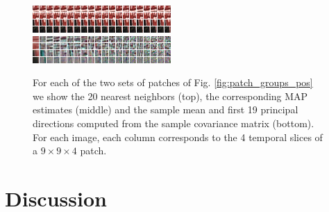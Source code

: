 \documentclass[10pt, journal, twocolumn, final, a4paper]{IEEEtran}
\begin{document}
\begin{figure}[htpb!]
	\includegraphics[width = \columnwidth]{figs/patch_groups/patch_group_bus_255_056_010_s40_wx37_wt2_sx9_st4_r040_n200_orig.png}\\
	\vspace{.2cm}
	\includegraphics[width = \columnwidth]{figs/patch_groups/patch_group_bus_255_056_010_s40_wx37_wt2_sx9_st4_r040_n200_pcas.png}\\
	\vspace{.2cm}
	\caption{For each of the two sets of patches of Fig. \ref{fig:patch_groups_pos} we show
	the 20 nearest neighbors (top), the corresponding MAP estimates (middle) and the sample mean 
	and first 19 principal directions computed from the sample covariance matrix (bottom).
	For each image, each column corresponds to the 4 temporal slices of a $9\times9\times4$ patch.}
	\label{fig:patch_groups_patches}
\end{figure}

\section{Discussion}
\end{document}

